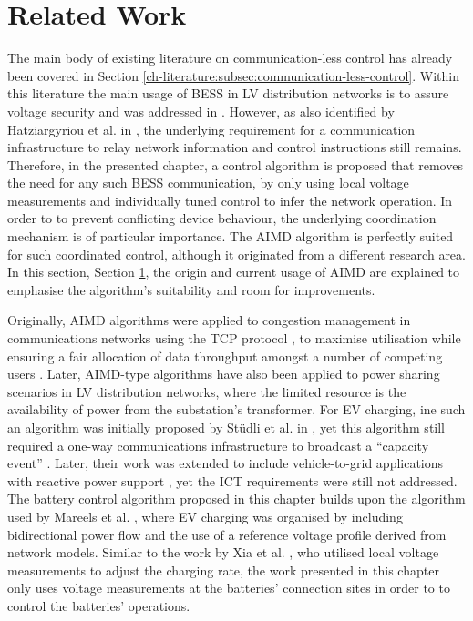 \section{Related Work}
\label{ch4:sec:related-work}

The main body of existing literature on communication-less control has already been covered in Section \ref{ch-literature:subsec:communication-less-control}.
Within this literature the main usage of BESS in LV distribution networks is to assure voltage security and was addressed in \cite{Sugihara2013, Toledo2013, Marra2013, Mokhtari2013, Atia2016}.
However, as also identified by Hatziargyriou et al. in \cite{Hatziargyriou2015}, the underlying requirement for a communication infrastructure to relay network information and control instructions still remains.
Therefore, in the presented chapter, a control algorithm is proposed that removes the need for any such BESS communication, by only using local voltage measurements and individually tuned control to infer the network operation.
In order to to prevent conflicting device behaviour, the underlying coordination mechanism is of particular importance.
The AIMD algorithm is perfectly suited for such coordinated control, although it originated from a different research area.
In this section, Section \ref{ch4:sec:related-work}, the origin and current usage of AIMD are explained to emphasise the algorithm's suitability and room for improvements.

Originally, AIMD algorithms were applied to congestion management in communications networks using the TCP protocol \cite{Chiu1989}, to maximise utilisation while ensuring a fair allocation of data throughput amongst a number of competing users \cite{Wirth2014}.
Later, AIMD-type algorithms have also been applied to power sharing scenarios in LV distribution networks, where the limited resource is the availability of power from the substation's transformer.
For EV charging, ine such an algorithm was initially proposed by St{\"{u}}dli et al. in \cite{Studli2012}, yet this algorithm still required a one-way communications infrastructure to broadcast a ``capacity event'' \cite{Studli2014, Studli2014a}.
Later, their work was extended to include vehicle-to-grid applications with reactive power support \cite {Studli2015}, yet the ICT requirements were still not addressed.
The battery control algorithm proposed in this chapter builds upon the algorithm used by Mareels et al. \cite{Mareels2014}, where EV charging was organised by including bidirectional power flow and the use of a reference voltage profile derived from network models.
Similar to the work by Xia et al. \cite{Xia2014}, who utilised local voltage measurements to adjust the charging rate, the work presented in this chapter only uses voltage measurements at the batteries' connection sites in order to to control the batteries' operations.

